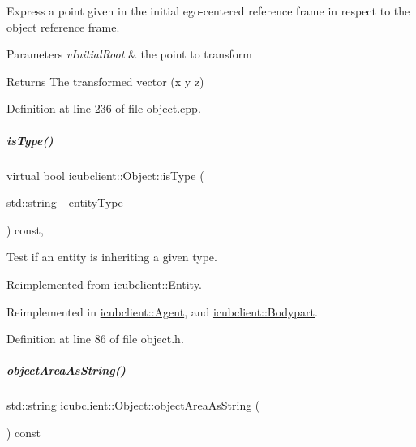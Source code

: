 Express a point given in the initial ego-\/centered reference frame in respect to the object reference frame. 


\begin{DoxyParams}{Parameters}
{\em v\+Initial\+Root} & the point to transform \\
\hline
\end{DoxyParams}
\begin{DoxyReturn}{Returns}
The transformed vector (x y z) 
\end{DoxyReturn}


Definition at line 236 of file object.\+cpp.

\mbox{\label{group__icubclient__representations_a90398d2c9cc2a42617b50fcbc4533734}} 
\subparagraph{\texorpdfstring{is\+Type()}{isType()}}
{\footnotesize\ttfamily virtual bool icubclient\+::\+Object\+::is\+Type (\begin{DoxyParamCaption}\item[{std\+::string}]{\+\_\+entity\+Type }\end{DoxyParamCaption}) const\hspace{0.3cm}{\ttfamily [inline]}, {\ttfamily [virtual]}}



Test if an entity is inheriting a given type. 



Reimplemented from \hyperlink{group__icubclient__representations_a5cbd0e5e254b3881a6a0adfc28107eb5}{icubclient\+::\+Entity}.



Reimplemented in \hyperlink{group__icubclient__representations_a0ec60560ae6d20bffb64ce9aa6339894}{icubclient\+::\+Agent}, and \hyperlink{group__icubclient__representations_a092e89cbeecc23d729be0423216a9920}{icubclient\+::\+Bodypart}.



Definition at line 86 of file object.\+h.

\mbox{\label{group__icubclient__representations_a1b656b2a08b880ca5905c3b2e675af19}} 
\subparagraph{\texorpdfstring{object\+Area\+As\+String()}{objectAreaAsString()}\hspace{0.1cm}{\footnotesize\ttfamily [1/2]}}
{\footnotesize\ttfamily std\+::string icubclient\+::\+Object\+::object\+Area\+As\+String (\begin{DoxyParamCaption}{ }\end{DoxyParamCaption}) const\hspace{0.3cm}{\ttfamily [inline]}}



